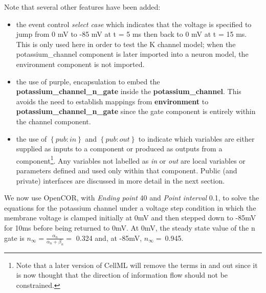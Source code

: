 \documentclass[a4paper,10pt,english]{sphinxmanual}
\renewcommand{\DUspan}[2]{#1, #2}
\begin{document}
Note that several other features have been added:
\begin{itemize}
\item {} 
the event control \emph{select case} which indicates that the voltage is
specified to jump from 0 mV to -85 mV at t = 5 ms then back to 0 mV at
t = 15 ms. This is only used here in order to test the K channel model;
when the potassium\_channel component is later imported into a neuron
model, the environment component is not imported.

\item {} 
the use of \DUspan{purple}{encapsulation} to embed the
\textbf{potassium\_channel\_n\_gate} inside the \textbf{potassium\_channel}.
This avoids the need to establish mappings from \textbf{environment} to
\textbf{potassium\_channel\_n\_gate} since the gate component is entirely
within the channel component.

\item {} 
the use of \(\left\{ pub:in \right\}\) and
\(\left\{ pub:out \right\}\) to indicate which variables are
either supplied as inputs to a component or produced as outputs from
a component\footnote[3]{
Note that a later version of CellML will remove the terms in and out since it is now thought that the direction of information flow should not be constrained.
}. Any variables not labelled as \emph{in} or \emph{out} are
local variables or parameters defined and used only within that
component. Public (and private) interfaces are discussed in more
detail in the next section.

\end{itemize}

We now use OpenCOR, with \emph{Ending point} 40 and \emph{Point interval} 0.1, to
solve the equations for the potassium channel under a voltage step
condition in which the membrane voltage is clamped initially at 0mV and
then stepped down to -85mV for 10ms before being returned to 0mV. At
0mV, the steady state value of the n gate is
\(n_{\infty} = \frac{\alpha_{n}}{\alpha_{n} + \beta_{n}} =\) 0.324
and, at -85mV, \(n_{\infty} = \ \)0.945.
\end{document}

